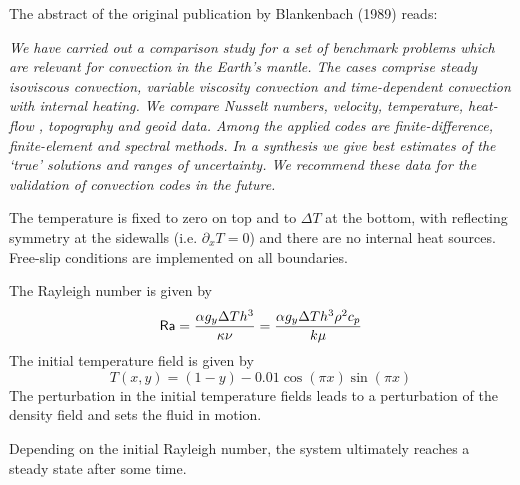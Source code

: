 
The abstract of the original publication by Blankenbach \etal (1989) \cite{blbc89} reads:
\begin{center}
{\it 
We have carried out a comparison study for a set of benchmark problems 
which are relevant for convection in the Earth’s mantle. The cases comprise 
steady isoviscous convection, variable viscosity convection and time-dependent 
convection with internal heating. We compare Nusselt numbers, velocity, 
temperature, heat-flow , topography and geoid data. Among the applied codes 
are finite-difference, finite-element and spectral methods. In a synthesis 
we give best estimates of the ‘true’ solutions and ranges of uncertainty. We
recommend these data for the validation of convection codes in the future.
}
\end{center}

The temperature is fixed to zero on top and to $\Delta T$ at the bottom, 
with reflecting symmetry at the sidewalls (i.e. $\partial_x T=0$) 
and there are no internal heat sources. 
Free-slip conditions are implemented on all boundaries. 

The Rayleigh number is given by
\[
{\mathsf{Ra}} = \frac{\alpha g_y \Delta T h^3 }{\kappa \nu}
=\frac{\alpha g_y \Delta T h^3 \rho^2 c_p}{k \mu}
\]
The initial temperature field is given by 
\[
T(x,y)=(1-y) - 0.01\cos(\pi x) \sin(\pi x)
\]
The perturbation in the initial temperature fields leads to 
a perturbation of the density field and sets the fluid in motion. 

Depending on the initial Rayleigh number, the system ultimately reaches a 
steady state after some time. 

